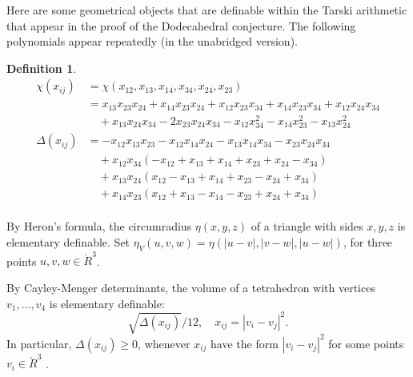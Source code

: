 \documentclass{article} %
\newtheorem{definition}[lemma]{Definition}
\begin{document}
Here are some geometrical 
objects that are definable within the Tarski arithmetic
that appear in the proof of the Dodecahedral conjecture.
The following  polynomials appear repeatedly (in the unabridged version).
\begin{definition}
$$
\begin{array}{lll}
 \chi(x_{ij}) &= \chi(x_{12},x_{13},x_{14},x_{34},x_{24},x_{23})\\
     &=
      x_{13} x_{23} x_{24} + x_{14} x_{23} x_{24}  + 
      x_{12} x_{23} x_{34} + x_{14} x_{23} x_{34} + x_{12} x_{24} x_{34}\\ 
      &\quad + x_{13} x_{24} x_{34} - 
      2 x_{23} x_{24} x_{34} - x_{12} x_{34}^2 
      - x_{14} x_{23}^2 - x_{13} x_{24}^2\\
[0.5ex]
\Delta(x_{ij}) &= 
   -x_{12} x_{13} x_{23} - x_{12} x_{14} x_{24} - x_{13} x_{14} x_{34} 
    - x_{23} x_{24} x_{34}\\
    &\quad + x_{12} x_{34} (-x_{12} + x_{13} + x_{14} + x_{23} + x_{24} - x_{34}) \\
  &\quad + x_{13} x_{24} (x_{12} - x_{13} + x_{14} + x_{23} - x_{24} + x_{34})\\
    &\quad + x_{14} x_{23} (x_{12} + x_{13} - x_{14} - x_{23} + x_{24} + x_{34})\\
\end{array}
    \label{def:chi}
\label{def:tar:delta}
\label{def:ups}
$$
\end{definition}

By Heron's formula, the circumradius $\eta(x,y,z)$ of a triangle with sides $x,y,z$ is elementary definable.
Set $\eta_V(u,v,w) = \eta(|u-v|,|v-w|,|u-w|)$, for three points
$u,v,w\in\ring{R}^3$.

By Cayley-Menger determinants, the volume  of a tetrahedron with vertices $v_1,\ldots,v_4$ is elementary definable:
   $$
   \sqrt{\Delta(x_{ij})}/12,\quad x_{ij}=|v_i-v_j|^2.
   $$
In particular, $\Delta(x_{ij})\ge0$, whenever $x_{ij}$ have
the form $|v_i-v_j|^2$ for some points $v_i\in\ring{R}^3$
\cite[Lemma~8.1.4]{Part1}.
\end{document}
